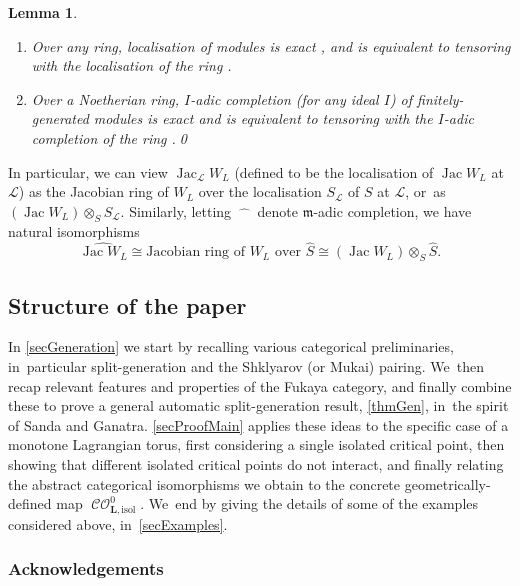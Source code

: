 \documentclass[JEP,XML,SOM,Unicode,NoEqCountersInSection,NoFloatCountersInSection,published]{cedram}
\newtheorem{lemma}[theorem]{Lemma}
\theoremstyle{definition}
\newcommand{\hatS}{\widehat{S}}
\newcommand{\calL}{\mathcal{L}}
\newcommand{\bL}{{\boldsymbol{L}}}
\newcommand{\m}{\mathfrak{m}}
\newcommand{\isol}{\mathrm{isol}}
\newcommand{\CO}{\operatorname{\mathcal{CO}}}
\newcommand{\Jac}{\operatorname{Jac}}
\newcommand{\COisol}{\CO^0_{\bL, \isol}}
\begin{document}
\skpt
\begin{lemma}
\label{lemCommAlg}
\begin{enumerate}
\item\label{itmLocalisation} Over any ring, localisation of modules is exact \cite[Prop.\,10.9.12]{stacks-project}, and is equivalent to tensoring with the localisation of the ring \cite[Lem.\,10.12.15]{stacks-project}.
\item\label{itmCompletion} Over a Noetherian ring, $I$-adic completion (for any ideal $I$) of finitely-generated modules is exact \cite[Lem.\,10.97.1(1)]{stacks-project} and is equivalent to tensoring with the $I$-adic completion of the ring \cite[Lem.\,10.97.1(3)]{stacks-project}.\qed
\end{enumerate}
\end{lemma}

In particular, we can view $\Jac_\calL W_L$ (defined to be the localisation of $\Jac W_L$ at $\calL$) as the Jacobian ring of $W_L$ over the localisation $S_\calL$ of $S$ at $\calL$, or~as $(\Jac W_L) \otimes_S S_\calL$. Similarly, letting $\widehat{\phantom{-}}$ denote $\m$-adic completion, we have natural isomorphisms
\[
\widehat{\Jac W_L} \cong \text{Jacobian ring of $W_L$ over $\hatS$} \cong (\Jac W_L) \otimes_S \hatS.
\]

\subsection{Structure of the paper}

In \cref{secGeneration} we start by recalling various categorical preliminaries, in~particular split-generation and the Shklyarov (or Mukai) pairing. We~then recap relevant features and properties of the Fukaya category, and finally combine these to prove a general automatic split-generation result, \cref{thmGen}, in~the spirit of Sanda and Ganatra. \cref{secProofMain} applies these ideas to the specific case of a monotone Lagrangian torus, first considering a single isolated critical point, then showing that different isolated critical points do not interact, and finally relating the abstract categorical isomorphisms we obtain to the concrete geometrically-defined map $\COisol$. We~end by giving the details of some of the examples considered above, in~\cref{secExamples}.

\subsubsection*{Acknowledgements}
\end{document}
